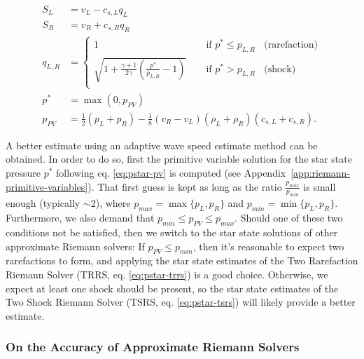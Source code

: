 \begin{align}
	S_L  &= v_L - c_{s,L} q_L \\
	S_R  &= v_R + c_{s,R} q_R \\
	q_{L,R} &=
		\begin{cases}
			1	~~~~ & \text{ if } p^* \leq p_{L,R} ~~~~ \text{(rarefaction)}\\
			\sqrt{1 + \frac{\gamma + 1}{2 \gamma} \left(\frac{p^*}{p_{L,R}} - 1 \right)}
			~~~~ & \text{ if } p^* > p_{L,R} ~~~~ \text{(shock)}\\
		\end{cases} \\
	p^* &= \max(0, p_{PV})\\
	p_{PV} &= \frac{1}{2} (p_L + p_R) - \frac{1}{8} (v_R - v_L)(\rho_L + \rho_R)(c_{s,L} + c_{s,R})
\label{eq:pstar-pv}.
\end{align}


A better estimate using an adaptive wave speed estimate method can be obtained.
In order to do so, first  the primitive variable solution for the star state pressure $p^*$
following eq. \ref{eq:pstar-pv} is computed (see Appendix~\ref{app:riemann-primitive-variables}).
That first guess is kept as long as the ratio $\frac{p_{max}}{p_{min}}$ is small enough (typically
$\sim 2$), where $p_{max} = \max \{ p_L, p_R \}$ and $p_{min} = \min \{ p_L, p_R \}$. Furthermore,
we also demand that $p_{min} \leq p_{PV} \leq p_{max}$. Should one of these two conditions not be
satisfied, then we switch to the star state solutions of other approximate Riemann solvers: If
$p_{PV} \leq p_{min}$, then it's reasonable to expect two rarefactions to form, and applying the
star state estimates of the Two Rarefaction Riemann Solver (TRRS, eq. \ref{eq:pstar-trrs}) is a good
choice. Otherwise, we expect at least one shock should be present, so the star state estimates of
the Two Shock Riemann Solver (TSRS, eq. \ref{eq:pstar-tsrs}) will likely provide a better estimate.





\subsubsection{On the Accuracy of Approximate Riemann Solvers}

